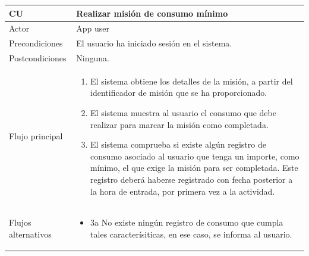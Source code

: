 \documentclass[twoside]{report}
\newcommand\addrow[2]{#1 &#2\\ }
\newcommand\addheading[2]{#1 &#2\\ \hline}
\newcommand\tabularhead{\begin{tabular}{lp{0.7\textwidth}}
\hline
}
\newenvironment{usecase}{\tabularhead}
{\hline\end{tabular}}
\begin{document}
\begin{usecase}
  \addheading{\textbf{CU\arabic{usecase}}}{Realizar misión de consumo mínimo} 
  \addrow{Actor}{App user}
  \addrow{Precondiciones}{El usuario ha iniciado sesión en el sistema.}
  \addrow{Postcondiciones}{Ninguna.}
  \addrow{Flujo principal}{
  		\begin{enumerate}
  		\item El sistema obtiene los detalles de la misión, a partir del identificador de misión que se ha proporcionado.
  		\item El sistema muestra al usuario el consumo que debe realizar para marcar la misión como completada.
  		\item El sistema comprueba si existe algún registro de consumo asociado al usuario que tenga un importe, como mínimo, el que exige la misión para ser completada. Este registro deberá haberse registrado con fecha posterior a la hora de entrada, por primera vez a la actividad.
  		\end{enumerate}
  }
  \addrow{Flujos alternativos}{
  		\begin{itemize}
  		\item 3a No existe ningún registro de consumo que cumpla tales caracterísiticas, en ese caso, se informa al usuario.
  		\end{itemize}
  }
\end{usecase}\\
\end{document}

